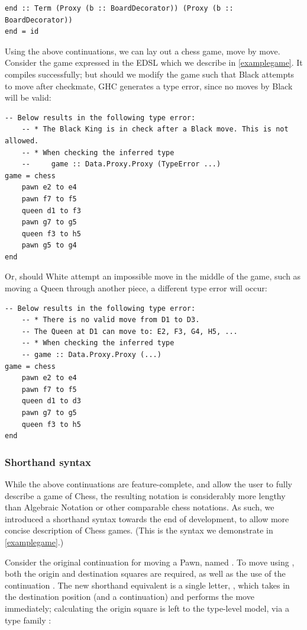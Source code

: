 \begin{lstlisting}
end :: Term (Proxy (b :: BoardDecorator)) (Proxy (b :: BoardDecorator))
end = id
\end{lstlisting}

Using the above continuations, we can lay out a chess game, move by move. Consider the game expressed in the EDSL which we describe in \cref{examplegame}. It compiles successfully; but should we modify the game such that Black attempts to move after checkmate, GHC generates a type error, since no moves by Black will be valid:

\begin{lstlisting}
-- Below results in the following type error:
    -- * The Black King is in check after a Black move. This is not allowed.
    -- * When checking the inferred type
    --     game :: Data.Proxy.Proxy (TypeError ...)
game = chess
    pawn e2 to e4
    pawn f7 to f5
    queen d1 to f3
    pawn g7 to g5
    queen f3 to h5
    pawn g5 to g4
end
\end{lstlisting}

Or, should White attempt an impossible move in the middle of the game, such as moving a Queen through another piece, a different type error will occur:

\begin{lstlisting}
-- Below results in the following type error:
    -- * There is no valid move from D1 to D3.
    -- The Queen at D1 can move to: E2, F3, G4, H5, ...
    -- * When checking the inferred type
    -- game :: Data.Proxy.Proxy (...)
game = chess
    pawn e2 to e4
    pawn f7 to f5
    queen d1 to d3
    pawn g7 to g5
    queen f3 to h5
end
\end{lstlisting}

\subsubsection{Shorthand syntax} \label{shorthandexplanation}

While the above continuations are feature-complete, and allow the user to fully describe a game of Chess, the resulting notation is considerably more lengthy than Algebraic Notation or other comparable chess notations. As such, we introduced a shorthand syntax towards the end of development, to allow more concise description of Chess games. (This is the syntax we demonstrate in \cref{examplegame}.)

Consider the original continuation for moving a Pawn, named . To move using , both the origin and destination squares are required, as well as the use of the continuation . The new shorthand equivalent is a single letter, , which takes in the destination position (and a continuation) and performs the move immediately; calculating the origin square is left to the type-level model, via a type family :


